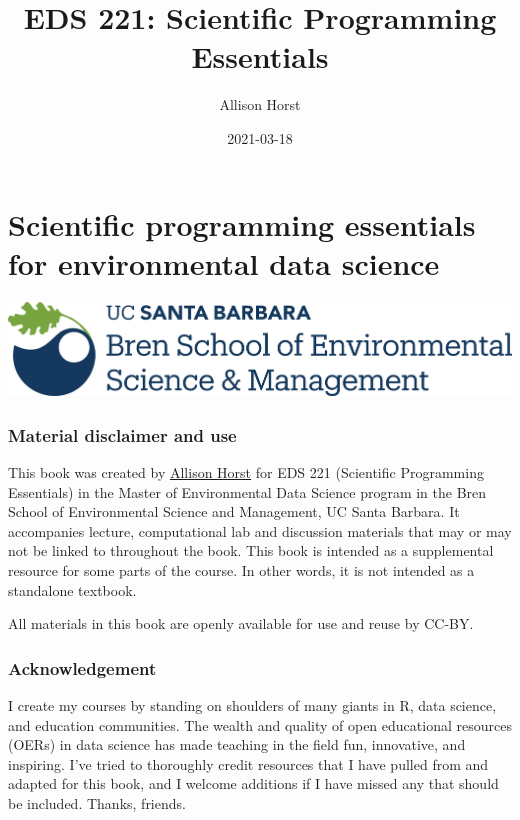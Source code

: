 \documentclass[
]{book}
\title{EDS 221: Scientific Programming Essentials}
\author{Allison Horst}
\date{2021-03-18}
\begin{document}
\maketitle

{
\setcounter{tocdepth}{1}
\tableofcontents
}
\hypertarget{scientific-programming-essentials-for-environmental-data-science}{%
\chapter{Scientific programming essentials for environmental data science}\label{scientific-programming-essentials-for-environmental-data-science}}

\includegraphics[width=0.5\linewidth]{images/bren_logo}

\hypertarget{material-disclaimer-and-use}{%
\subsection*{Material disclaimer and use}\label{material-disclaimer-and-use}}

This book was created by \href{www.allisonhorst.com}{Allison Horst} for EDS 221 (Scientific Programming Essentials) in the Master of Environmental Data Science program in the Bren School of Environmental Science and Management, UC Santa Barbara. It accompanies lecture, computational lab and discussion materials that may or may not be linked to throughout the book. This book is intended as a supplemental resource for some parts of the course. In other words, it is not intended as a standalone textbook.

All materials in this book are openly available for use and reuse by CC-BY.

\hypertarget{acknowledgement}{%
\subsection*{Acknowledgement}\label{acknowledgement}}

I create my courses by standing on shoulders of many giants in R, data science, and education communities. The wealth and quality of open educational resources (OERs) in data science has made teaching in the field fun, innovative, and inspiring. I've tried to thoroughly credit resources that I have pulled from and adapted for this book, and I welcome additions if I have missed any that should be included. Thanks, friends.
\end{document}

